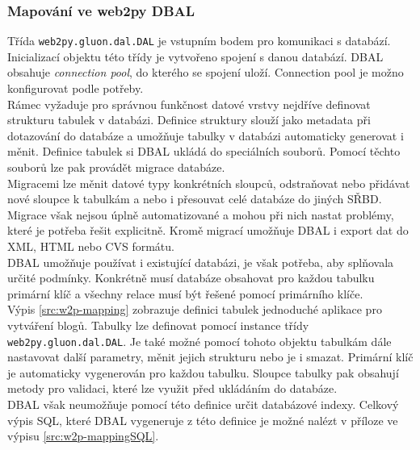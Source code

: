 \documentclass[ing,male,java,dept456]{diploma}						%
\begin{document}
\subsubsection{Mapování ve web2py DBAL}
Třída \lstinline[style=inlinepython]|web2py.gluon.dal.DAL| je vstupním bodem pro komunikaci s databází. Inicializací objektu této třídy je vytvořeno spojení s danou databází. DBAL obsahuje \textit{connection pool}, do kterého se spojení uloží. Connection pool je možno konfigurovat podle potřeby. \\
Rámec vyžaduje pro správnou funkčnost datové vrstvy nejdříve definovat strukturu tabulek v databázi. Definice struktury slouží jako metadata při dotazování do databáze a umožňuje tabulky v databázi automaticky generovat i měnit. Definice tabulek si DBAL ukládá do speciálních souborů. Pomocí těchto souborů lze pak provádět migrace databáze. \\
Migracemi lze měnit datové typy konkrétních sloupců, odstraňovat nebo přidávat nové sloupce k tabulkám a nebo i přesouvat celé databáze do jiných SŘBD. Migrace však nejsou úplně automatizované a mohou při nich nastat problémy, které je potřeba řešit explicitně. Kromě migrací umožňuje DBAL i export dat do XML, HTML nebo CVS formátu. \\
DBAL umožňuje používat i existující databázi, je však potřeba, aby splňovala určité podmínky. Konkrétně musí databáze obsahovat pro každou tabulku primární klíč a všechny relace musí být řešené pomocí primárního klíče. \\
Výpis \ref{src:w2p-mapping} zobrazuje definici tabulek jednoduché aplikace pro vytváření blogů. Tabulky lze definovat pomocí instance třídy \lstinline[style=inlinepython]|web2py.gluon.dal.DAL|. Je také možné pomocí tohoto objektu tabulkám dále nastavovat další parametry, měnit jejich strukturu nebo je i smazat. Primární klíč je automaticky vygenerován pro každou tabulku. Sloupce tabulky pak obsahují metody pro validaci, které lze využit před ukládáním do databáze. \\
DBAL však neumožňuje pomocí této definice určit databázové indexy. Celkový výpis SQL, které DBAL vygeneruje z této definice je možné nalézt v příloze ve výpisu \ref{src:w2p-mappingSQL}.
\end{document}
